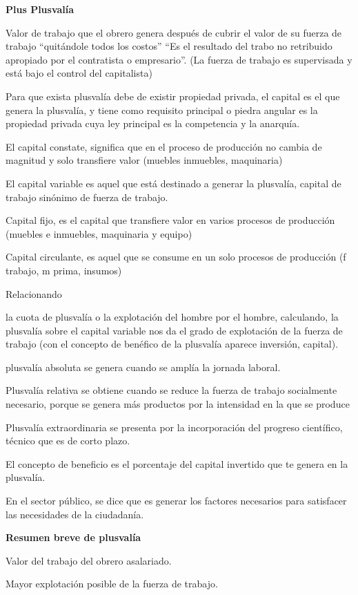 \documentclass[
  a4paper,
]{article}
\begin{document}
\textbf{Plus Plusvalía}

Valor de trabajo que el obrero genera después de cubrir el valor de su
fuerza de trabajo ``quitándole todos los costos'' ``Es el resultado del
trabo no retribuido apropiado por el contratista o empresario''. (La
fuerza de trabajo es supervisada y está bajo el control del capitalista)

Para que exista plusvalía debe de existir propiedad privada, el capital
es el que genera la plusvalía, y tiene como requisito principal o piedra
angular es la propiedad privada cuya ley principal es la competencia y
la anarquía.

El capital constate, significa que en el proceso de producción no cambia
de magnitud y solo transfiere valor (muebles inmuebles, maquinaria)

El capital variable es aquel que está destinado a generar la plusvalía,
capital de trabajo sinónimo de fuerza de trabajo.

Capital fijo, es el capital que transfiere valor en varios procesos de
producción (muebles e inmuebles, maquinaria y equipo)

Capital circulante, es aquel que se consume en un solo procesos de
producción (f trabajo, m prima, insumos)

Relacionando

la cuota de plusvalía o la explotación del hombre por el hombre,
calculando, la plusvalía sobre el capital variable nos da el grado de
explotación de la fuerza de trabajo (con el concepto de benéfico de la
plusvalía aparece inversión, capital).

plusvalía absoluta se genera cuando se amplía la jornada laboral.

Plusvalía relativa se obtiene cuando se reduce la fuerza de trabajo
socialmente necesario, porque se genera más productos por la intensidad
en la que se produce

Plusvalía extraordinaria se presenta por la incorporación del progreso
científico, técnico que es de corto plazo.

El concepto de beneficio es el porcentaje del capital invertido que te
genera en la plusvalía.

En el sector público, se dice que es generar los factores necesarios
para satisfacer las necesidades de la ciudadanía.

\textbf{Resumen breve de plusvalía}

Valor del trabajo del obrero asalariado.

Mayor explotación posible de la fuerza de trabajo.
\end{document}
